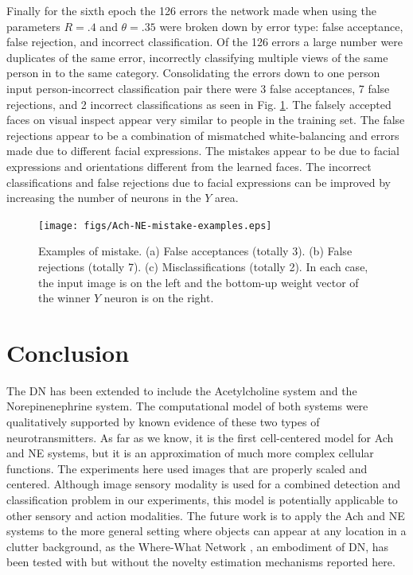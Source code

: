\documentclass[conference]{IEEEtran}
\begin{document}
Finally for the sixth epoch the 126 errors the network made when using the parameters $R=.4$ and $\theta=.35$ were broken down by error type: false acceptance, false rejection, and incorrect classification. Of the 126 errors a large number were duplicates of the same error, incorrectly classifying multiple views of the same person in to the same category.  Consolidating the errors down to one person input person-incorrect classification pair there were 3 false acceptances, 7 false rejections, and 2 incorrect classifications as seen in Fig. \ref{fig:6_epoch_errors}.  The falsely accepted faces on visual inspect appear very similar to people in the training set.  The false rejections appear to be a combination of mismatched white-balancing and errors made due to different facial expressions.  The mistakes appear to be due to facial expressions and orientations different from the learned faces.  The incorrect classifications and false rejections due to facial expressions can be improved by increasing the number of neurons in the $Y$ area.

\begin{figure}
\centering
\texttt{[image: figs/Ach-NE-mistake-examples.eps]}
\caption{Examples of mistake.  (a) False acceptances (totally 3).  (b) False rejections (totally 7).  (c)  Misclassifications (totally 2).  In each case, the input image is on the left and the bottom-up weight vector of the winner $Y$ neuron is on the right.}
\label{fig:6_epoch_errors}
\end{figure}

\section{Conclusion}
The DN has been extended to include the Acetylcholine system and the Norepinenephrine system. 
The computational model of both systems were qualitatively supported by known evidence of these
two types of neurotransmitters.  As far as we know, it is the first cell-centered model for Ach and NE systems, but it is an approximation of much more complex cellular functions.  The experiments here used images that are properly scaled and centered.  Although image sensory modality is used for a combined detection and classification problem in our experiments, this model is potentially applicable 
to other sensory and action modalities.   The future work is to apply the Ach and NE systems to the more general setting where
objects can appear at any location in a clutter background, as the Where-What Network \cite{WengNAI12}, an embodiment 
of DN, has been tested with but without the novelty estimation mechanisms reported here. 


\label{SE:bib}

%

\end{document}
